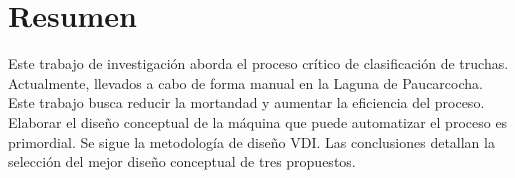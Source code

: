 
\newpage
\clearpage{\pagestyle{empty}\cleardoublepage}
\newpage

\pagestyle{empty}
\newpage
\chapter*{\centering \large Resumen} 

Este trabajo de investigación aborda el proceso crítico de clasificación de truchas. Actualmente, llevados a cabo de forma manual en la Laguna de Paucarcocha. Este trabajo busca reducir la mortandad y aumentar la eficiencia del proceso. Elaborar el diseño conceptual de la máquina que puede automatizar el proceso es primordial. Se sigue la metodología de diseño VDI. Las conclusiones detallan la selección del mejor diseño conceptual de tres propuestos.


